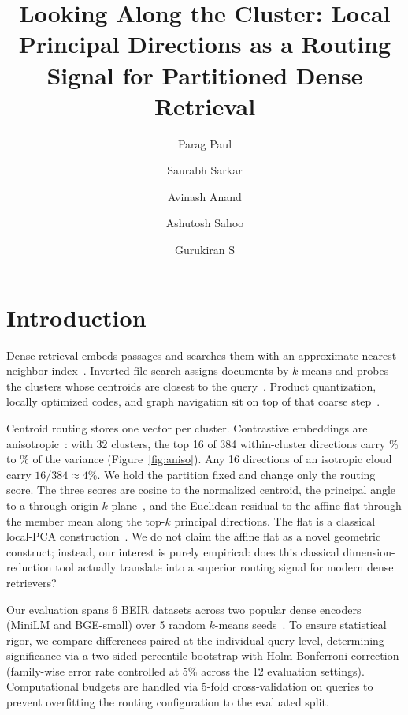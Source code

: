 \documentclass[sigconf,nonacm]{acmart}
\title{Looking Along the Cluster: Local Principal Directions as a Routing Signal for Partitioned Dense Retrieval}
\author{Parag Paul}
\affiliation{\country{}}
\author{Saurabh Sarkar}
\affiliation{\country{}}
\author{Avinash Anand}
\affiliation{\country{}}
\author{Ashutosh Sahoo}
\affiliation{\country{}}
\author{Gurukiran S}
\affiliation{\country{}}
\begin{document}
\maketitle

\section{Introduction}
\label{sec:intro}

Dense retrieval embeds passages and searches them with an approximate nearest neighbor index~\cite{lewis2020rag,karpukhin2020dpr}. Inverted-file search assigns documents by $k$-means and probes the clusters whose centroids are closest to the query~\cite{sivic2003video,jegou2011product}. Product quantization, locally optimized codes, and graph navigation sit on top of that coarse step~\cite{ge2014opq,kalantidis2014lopq,malkov2018hnsw,fu2019nsg,johnson2019faiss,douze2024faiss,guo2020scann}.

Centroid routing stores one vector per cluster. Contrastive embeddings are anisotropic~\cite{ethayarajh2019contextual}: with 32 clusters, the top 16 of 384 within-cluster directions carry \ExplainedLo\% to \ExplainedHi\% of the variance (Figure~\ref{fig:aniso}). Any 16 directions of an isotropic cloud carry $16/384 \approx 4\%$. We hold the partition fixed and change only the routing score. The three scores are cosine to the normalized centroid, the principal angle to a through-origin $k$-plane~\cite{basri2011approximate,wang2013fast}, and the Euclidean residual to the affine flat through the member mean along the top-$k$ principal directions. The flat is a classical local-PCA construction~\cite{bradley2000kplane,kambhatla1997localpca,tipping1999ppca,tipping1999mppca}. We do not claim the affine flat as a novel geometric construct; instead, our interest is purely empirical: does this classical dimension-reduction tool actually translate into a superior routing signal for modern dense retrievers?

Our evaluation spans 6 BEIR datasets across two popular dense encoders (MiniLM and BGE-small) over 5 random $k$-means seeds~\cite{thakur2021beir,wadden2020scifact,reimers2019sbert,wang2020minilm,xiao2023cpack}. To ensure statistical rigor, we compare differences paired at the individual query level, determining significance via a two-sided percentile bootstrap with Holm-Bonferroni correction (family-wise error rate controlled at 5\% across the 12 evaluation settings). Computational budgets are handled via 5-fold cross-validation on queries to prevent overfitting the routing configuration to the evaluated split.
\end{document}

